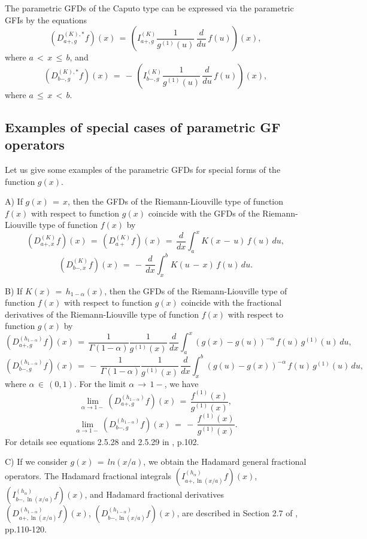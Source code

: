 \documentclass[12pt]{article}
\begin{document}
The parametric GFDs of the Caputo type can be expressed via the parametric GFIs by the equations
\[
(D^{(K),*}_{a+,g} f)(x) \, = \, 
\left(I^{(K)}_{a+,g} \frac{1}{g^{(1)}(u)} \, \frac{d}{du} \, f(u) \right)(x) ,
\]
where $a \, < \, x \, \le \, b$, and
\[
(D^{(K),*}_{b-,g} f)(x) \, = \, 
- \, 
\left(I^{(K)}_{b-,g} \frac{1}{g^{(1)}(u)} \, \frac{d}{du} \, f(u) \right)(x) ,
\]
where $a \, \le \, x \, < \, b$.



\subsection{Examples of special cases of parametric GF operators}

Let us give some examples of the parametric GFDs for special forms of the function $g(x)$.

A) If $g(x) \, = \, x$, then the GFDs of the Riemann-Liouville type of function $f(x)$ with respect to function $g(x)$ coincide with the GFDs of the Riemann-Liouville type of function $f(x)$ by
\[
(D^{(K)}_{a+,x} f)(x) \, = \, 
(D^{(K)}_{a+} f)(x) \, = \,
\frac{d}{dx}
\int^x_a K(x \, - \, u) \, f(u) \, du ,
\]
\[
(D^{(K)}_{b-,x} f)(x) \, = \, 
- \, \frac{d}{dx}
\int^b_x K(u \, - \, x) \, f(u) \, du .
\]

B) If $K(x) \, = \, h_{1-\alpha}(x)$, 
then the GFDs of the Riemann-Liouville type of function $f(x)$ with respect to function $g(x)$ coincide with the fractional derivatives of the Riemann-Liouville type of function $f(x)$ with respect to function $g(x)$ \cite{KST,SKM} by
\[
(D^{(h_{1-\alpha})}_{a+,g} f)(x) \, = \, 
\frac{1}{\Gamma(1-\alpha)} 
\frac{1}{g^{(1)}(x)} \, \frac{d}{dx}
\int^x_a (g(x)-g(u))^{-\alpha} \, f(u) \, g^{(1)}(u) \, du ,
\]
\[
(D^{(h_{1-\alpha})}_{b-,g} f)(x) \, = \,
- \, \frac{1}{\Gamma(1-\alpha)} 
\frac{1}{g^{(1)}(x)} \, \frac{d}{dx}
\int^b_x (g(u)-g(x))^{-\alpha} \, f(u) \, g^{(1)}(u) \, du ,
\]
where $\alpha \, \in \, (0,1)$.
For the limit $\alpha \, \to \, 1-$, we have
\[
\lim\limits_{\alpha \to 1-}
(D^{(h_{1-\alpha})}_{a+,g} f)(x) \, = \, 
\frac{f^{(1)}(x)}{g^{(1)}(x)} ,
\]
\[
\lim\limits_{\alpha \to 1-}
(D^{(h_{1-\alpha})}_{b-,g} f)(x) \, = \, 
- \, \frac{f^{(1)}(x)}{g^{(1)}(x)} .
\]
For details see equations 2.5.28 and 2.5.29 in \cite{KST}, p.102.

C) If we consider $g(x) \, = \, ln(x/a)$, we obtain the Hadamard general fractional operators. 
The Hadamard fractional integrals 
$(I^{(h_{\alpha})}_{a+,\ln(x/a)} f)(x)$, 
$(I^{(h_{\alpha})}_{b-,\ln(x/a)} f)(x)$, 
and Hadamard fractional derivatives 
$(D^{(h_{1-\alpha})}_{a+,\ln(x/a)} f)(x)$,
$(D^{(h_{1-\alpha})}_{b-,\ln(x/a)} f)(x)$,
are described in Section 2.7 of \cite{KST}, pp.110-120.
\end{document}

